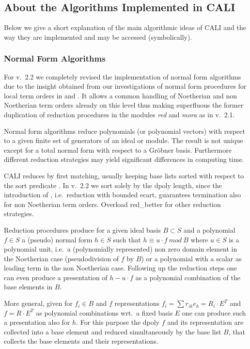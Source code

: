 \subsection{About the Algorithms Implemented in CALI}

Below we give a short explanation of the main algorithmic ideas of
CALI and the way they are implemented and may be accessed
(symbolically). 

\subsubsection{Normal Form Algorithms}

For v.\ 2.2 we completely revised the implementation of normal form
algorithms due to the insight obtained from our investigations of
normal form procedures for local term orders in \cite{ala} and
\cite{tcah}. It allows a common handling of Noetherian and non
Noetherian term orders already on this level thus making superfluous
the former duplication of reduction procedures in the modules {\em
red} and \emph{mora} as in v.\ 2.1.
\medskip

Normal form algorithms reduce polynomials (or polynomial vectors)
with respect to a given finite set of generators of an ideal or
module. The result is not unique except for a total normal form with
respect to a Gr\"obner basis. Furthermore different reduction strategies
may yield significant differences in computing time.

CALI reduces by first matching, usually keeping base lists sorted
with respect to the sort predicate . In v.\ 2.2 we
sort solely by the dpoly length, since the introduction of
, i.e.\ reduction with bounded ecart, guarantees
termination also for non Noetherian term orders. Overload red\_better
for other reduction strategies. 
\medskip

Reduction procedures produce for a given ideal basis $B\subset S$ and
a polynomial $f\in S$ a (pseudo) normal form $h\in S$ such that
$h\equiv u\cdot f\ mod\ B$ where $u\in S$ is a polynomial unit, i.e.\
a (polynomially represented) non zero domain element in the Noetherian
case (pseudodivision of $f$ by $B$) or a polynomial with a scalar as
leading term in the non Noetherian case. Following up the reduction
steps one can even produce a presentation of $h-u\cdot f$ as a
polynomial combination of the base elements in $B$.

More general, given for $f_i\in B$ and $f$ representations $f_i =
\sum{r_{ik}e_k} = R_i\cdot E^T$ and $f=R\cdot E^T$ as polynomial
combinations wrt.\ a fixed basis $E$ one can produce such a
presentation also for $h$. For this purpose the dpoly $f$ and its
representation are collected into a base element and reduced
simultaneously by the base list $B$, that collects the base elements
and their representations. 
\medskip

